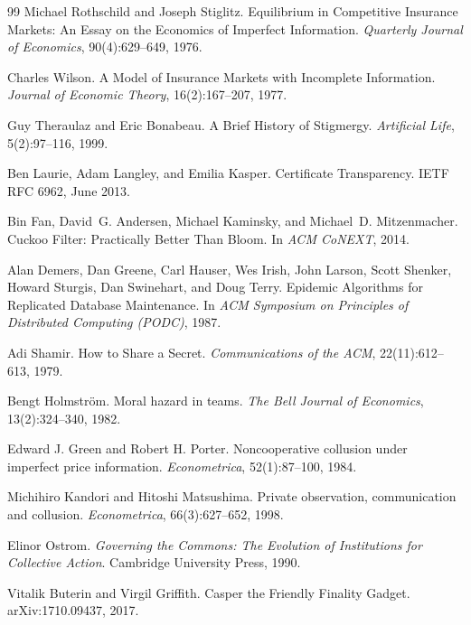\documentclass[11pt,a4paper]{article}
\theoremstyle{definition}
\theoremstyle{remark}
\begin{document}
\begin{thebibliography}{99}
Michael Rothschild and Joseph Stiglitz.
\newblock Equilibrium in Competitive Insurance Markets: An Essay on the Economics of Imperfect Information.
\newblock \textit{Quarterly Journal of Economics}, 90(4):629--649, 1976.

Charles Wilson.
\newblock A Model of Insurance Markets with Incomplete Information.
\newblock \textit{Journal of Economic Theory}, 16(2):167--207, 1977.

Guy Theraulaz and Eric Bonabeau.
\newblock A Brief History of Stigmergy.
\newblock \textit{Artificial Life}, 5(2):97--116, 1999.

Ben Laurie, Adam Langley, and Emilia Kasper.
\newblock Certificate Transparency.
\newblock IETF RFC 6962, June 2013.

Bin Fan, David~G. Andersen, Michael Kaminsky, and Michael~D. Mitzenmacher.
\newblock Cuckoo Filter: Practically Better Than Bloom.
\newblock In \textit{ACM CoNEXT}, 2014.

Alan Demers, Dan Greene, Carl Hauser, Wes Irish, John Larson, Scott Shenker, Howard Sturgis, Dan Swinehart, and Doug Terry.
\newblock Epidemic Algorithms for Replicated Database Maintenance.
\newblock In \textit{ACM Symposium on Principles of Distributed Computing (PODC)}, 1987.

Adi Shamir.
\newblock How to Share a Secret.
\newblock \textit{Communications of the ACM}, 22(11):612--613, 1979.

Bengt Holmstr\"om.
\newblock Moral hazard in teams.
\newblock \textit{The Bell Journal of Economics}, 13(2):324--340, 1982.

Edward J. Green and Robert H. Porter.
\newblock Noncooperative collusion under imperfect price information.
\newblock \textit{Econometrica}, 52(1):87--100, 1984.

Michihiro Kandori and Hitoshi Matsushima.
\newblock Private observation, communication and collusion.
\newblock \textit{Econometrica}, 66(3):627--652, 1998.

Elinor Ostrom.
\newblock \textit{Governing the Commons: The Evolution of Institutions for Collective Action}.
\newblock Cambridge University Press, 1990.

Vitalik Buterin and Virgil Griffith.
\newblock Casper the Friendly Finality Gadget.
\newblock arXiv:1710.09437, 2017.


\end{thebibliography}
\end{document}
